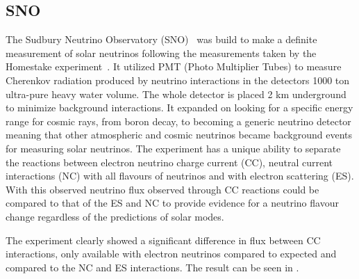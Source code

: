 \subsection{SNO}
The Sudbury Neutrino Observatory (SNO)~\cite{Fix6} was build to make a definite measurement of solar neutrinos following the measurements taken by the Homestake experiment~\cite{9Davis}. It utilized PMT (Photo Multiplier Tubes) to measure Cherenkov radiation produced by neutrino interactions in the detectors 1000 ton ultra-pure heavy water volume. The whole detector is placed 2 km underground to minimize background interactions. It expanded on looking for a specific energy range for cosmic rays, from boron decay, to becoming a generic neutrino detector meaning that other atmospheric and cosmic neutrinos became background events for measuring solar neutrinos. The experiment has a unique ability to separate the reactions between electron neutrino charge current (CC), neutral current interactions (NC) with all flavours of neutrinos and with electron scattering (ES). With this observed neutrino flux observed through CC reactions could be compared to that of the ES  and NC to provide evidence for a neutrino flavour change regardless of the predictions of solar modes.

The experiment clearly showed a significant difference in flux between CC interactions, only available with electron neutrinos compared to expected and compared to the NC and ES interactions. The result can be seen in .

